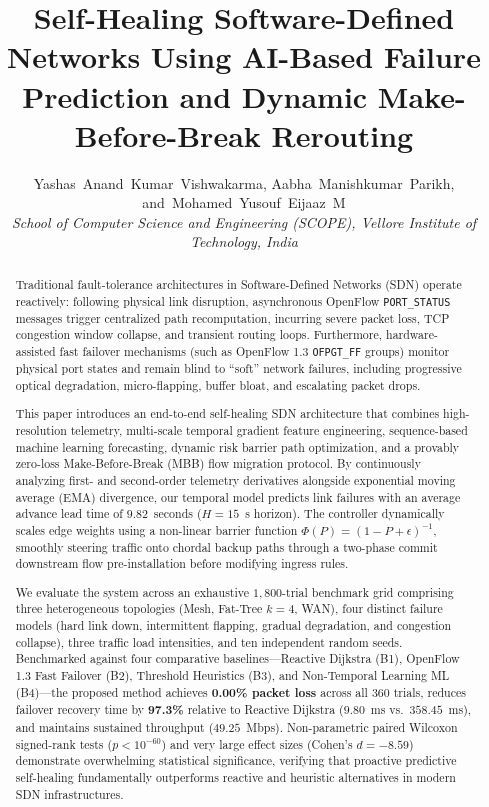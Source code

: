 \documentclass[journal,10pt,twocolumn]{IEEEtran}
\begin{document}
\title{Self-Healing Software-Defined Networks Using AI-Based Failure Prediction and Dynamic Make-Before-Break Rerouting}

\author{Yashas~Anand~Kumar~Vishwakarma, Aabha~Manishkumar~Parikh, and~Mohamed~Yusouf~Eijaaz~M\\
\textit{School of Computer Science and Engineering (SCOPE), Vellore Institute of Technology, India}
}

\maketitle

\begin{abstract}
Traditional fault-tolerance architectures in Software-Defined Networks (SDN) operate reactively: following physical link disruption, asynchronous OpenFlow \texttt{PORT\_STATUS} messages trigger centralized path recomputation, incurring severe packet loss, TCP congestion window collapse, and transient routing loops. Furthermore, hardware-assisted fast failover mechanisms (such as OpenFlow 1.3 \texttt{OFPGT\_FF} groups) monitor physical port states and remain blind to ``soft'' network failures, including progressive optical degradation, micro-flapping, buffer bloat, and escalating packet drops. 

This paper introduces an end-to-end self-healing SDN architecture that combines high-resolution telemetry, multi-scale temporal gradient feature engineering, sequence-based machine learning forecasting, dynamic risk barrier path optimization, and a provably zero-loss Make-Before-Break (MBB) flow migration protocol. By continuously analyzing first- and second-order telemetry derivatives alongside exponential moving average (EMA) divergence, our temporal model predicts link failures with an average advance lead time of $9.82$~seconds ($H=15$~s horizon). The controller dynamically scales edge weights using a non-linear barrier function $\Phi(P) = (1 - P + \epsilon)^{-1}$, smoothly steering traffic onto chordal backup paths through a two-phase commit downstream flow pre-installation before modifying ingress rules.

We evaluate the system across an exhaustive $1{,}800$-trial benchmark grid comprising three heterogeneous topologies (Mesh, Fat-Tree $k=4$, WAN), four distinct failure models (hard link down, intermittent flapping, gradual degradation, and congestion collapse), three traffic load intensities, and ten independent random seeds. Benchmarked against four comparative baselines---Reactive Dijkstra (B1), OpenFlow 1.3 Fast Failover (B2), Threshold Heuristics (B3), and Non-Temporal Learning ML (B4)---the proposed method achieves \textbf{0.00\% packet loss} across all 360 trials, reduces failover recovery time by \textbf{97.3\%} relative to Reactive Dijkstra ($9.80$~ms vs.\ $358.45$~ms), and maintains sustained throughput ($49.25$~Mbps). Non-parametric paired Wilcoxon signed-rank tests ($p < 10^{-60}$) and very large effect sizes (Cohen's $d = -8.59$) demonstrate overwhelming statistical significance, verifying that proactive predictive self-healing fundamentally outperforms reactive and heuristic alternatives in modern SDN infrastructures.
\end{abstract}
\end{document}
